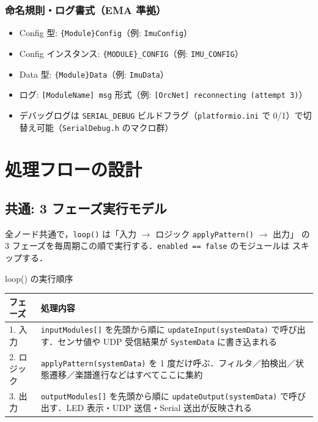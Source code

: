 \documentclass[lualatex,book,paper=a4paper,jafontsize=11.5pt,jafontscale=1.05]{jlreq}
\begin{document}
\subsubsection{命名規則・ログ書式（EMA 準拠）}

\begin{itemize}
  \item Config 型: \texttt{\{Module\}Config}（例: \texttt{ImuConfig}）
  \item Config インスタンス: \texttt{\{MODULE\}\_CONFIG}（例: \texttt{IMU\_CONFIG}）
  \item Data 型: \texttt{\{Module\}Data}（例: \texttt{ImuData}）
  \item ログ: \texttt{[ModuleName] msg} 形式（例: \texttt{[OrcNet] reconnecting (attempt 3)}）
  \item デバッグログは \texttt{SERIAL\_DEBUG} ビルドフラグ（\texttt{platformio.ini} で 0/1）で切替え可能（\texttt{SerialDebug.h} のマクロ群）
\end{itemize}


\section{処理フローの設計}\label{sec:proc-flow}

\subsection{共通: 3 フェーズ実行モデル}

全ノード共通で，\texttt{loop()} は「入力 $\to$ ロジック \texttt{applyPattern()} $\to$ 出力」
の 3 フェーズを毎周期この順で実行する．\texttt{enabled == false} のモジュールは
スキップする．

\begin{apibox}{loop() の実行順序}
\begin{tabular}{l p{}}
\toprule
\textbf{フェーズ} & \textbf{処理内容} \\
\midrule
1. 入力 & \texttt{inputModules[]} を先頭から順に \texttt{updateInput(systemData)} で呼び出す．センサ値や UDP 受信結果が \texttt{SystemData} に書き込まれる \\
2. ロジック & \texttt{applyPattern(systemData)} を 1 度だけ呼ぶ．フィルタ／拍検出／状態遷移／楽譜進行などはすべてここに集約 \\
3. 出力 & \texttt{outputModules[]} を先頭から順に \texttt{updateOutput(systemData)} で呼び出す．LED 表示・UDP 送信・Serial 送出が反映される \\
\bottomrule
\end{tabular}
\end{apibox}
\end{document}
